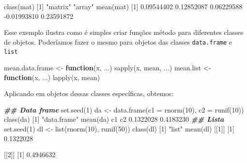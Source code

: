\documentclass[
  10pt,
  a4paper]{book}
\newenvironment{Shaded}{\begin{snugshade}}{\end{snugshade}}
\newcommand{\AttributeTok}[1]{\textcolor[rgb]{0.77,0.63,0.00}{#1}}
\newcommand{\ControlFlowTok}[1]{\textcolor[rgb]{0.13,0.29,0.53}{\textbf{#1}}}
\newcommand{\DecValTok}[1]{\textcolor[rgb]{0.00,0.00,0.81}{#1}}
\newcommand{\DocumentationTok}[1]{\textcolor[rgb]{0.56,0.35,0.01}{\textbf{\textit{#1}}}}
\newcommand{\FloatTok}[1]{\textcolor[rgb]{0.00,0.00,0.81}{#1}}
\newcommand{\FunctionTok}[1]{\textcolor[rgb]{0.00,0.00,0.00}{#1}}
\newcommand{\NormalTok}[1]{#1}
\newcommand{\OtherTok}[1]{\textcolor[rgb]{0.56,0.35,0.01}{#1}}
\newcommand{\SpecialCharTok}[1]{\textcolor[rgb]{0.00,0.00,0.00}{#1}}
\newcommand{\StringTok}[1]{\textcolor[rgb]{0.31,0.60,0.02}{#1}}
\begin{document}
\begin{Shaded}
\begin{Highlighting}[]
\FunctionTok{class}\NormalTok{(mat)}
\NormalTok{[}\DecValTok{1}\NormalTok{] }\StringTok{"matrix"} \StringTok{"array"} 
\FunctionTok{mean}\NormalTok{(mat)}
\NormalTok{[}\DecValTok{1}\NormalTok{]  }\FloatTok{0.09544402}  \FloatTok{0.12852087}  \FloatTok{0.06229588} \SpecialCharTok{{-}}\FloatTok{0.01993810}  \FloatTok{0.23591872}
\end{Highlighting}
\end{Shaded}

Esse exemplo ilustra como é simples criar funções método para
diferentes classes de objetos. Poderíamos fazer o mesmo para objetos das
classes \texttt{data.frame} e \texttt{list}

\begin{Shaded}
\begin{Highlighting}[]
\NormalTok{mean.data.frame }\OtherTok{\textless{}{-}} \ControlFlowTok{function}\NormalTok{(x, ...) }\FunctionTok{sapply}\NormalTok{(x, mean, ...)}
\NormalTok{mean.list }\OtherTok{\textless{}{-}} \ControlFlowTok{function}\NormalTok{(x, ...) }\FunctionTok{lapply}\NormalTok{(x, mean)}
\end{Highlighting}
\end{Shaded}

Aplicando em objetos dessas classes específicas, obtemos:

\begin{Shaded}
\begin{Highlighting}[]
\DocumentationTok{\#\# Data frame}
\FunctionTok{set.seed}\NormalTok{(}\DecValTok{1}\NormalTok{)}
\NormalTok{da }\OtherTok{\textless{}{-}} \FunctionTok{data.frame}\NormalTok{(}\AttributeTok{c1 =} \FunctionTok{rnorm}\NormalTok{(}\DecValTok{10}\NormalTok{),}
                 \AttributeTok{c2 =} \FunctionTok{runif}\NormalTok{(}\DecValTok{10}\NormalTok{))}
\FunctionTok{class}\NormalTok{(da)}
\NormalTok{[}\DecValTok{1}\NormalTok{] }\StringTok{"data.frame"}
\FunctionTok{mean}\NormalTok{(da)}
\NormalTok{       c1        c2 }
\FloatTok{0.1322028} \FloatTok{0.4183230} 
\DocumentationTok{\#\# Lista}
\FunctionTok{set.seed}\NormalTok{(}\DecValTok{1}\NormalTok{)}
\NormalTok{dl }\OtherTok{\textless{}{-}} \FunctionTok{list}\NormalTok{(}\FunctionTok{rnorm}\NormalTok{(}\DecValTok{10}\NormalTok{), }\FunctionTok{runif}\NormalTok{(}\DecValTok{50}\NormalTok{))}
\FunctionTok{class}\NormalTok{(dl)}
\NormalTok{[}\DecValTok{1}\NormalTok{] }\StringTok{"list"}
\FunctionTok{mean}\NormalTok{(dl)}
\NormalTok{[[}\DecValTok{1}\NormalTok{]]}
\NormalTok{[}\DecValTok{1}\NormalTok{] }\FloatTok{0.1322028}

\NormalTok{[[}\DecValTok{2}\NormalTok{]]}
\NormalTok{[}\DecValTok{1}\NormalTok{] }\FloatTok{0.4946632}
\end{Highlighting}
\end{Shaded}
\end{document}
